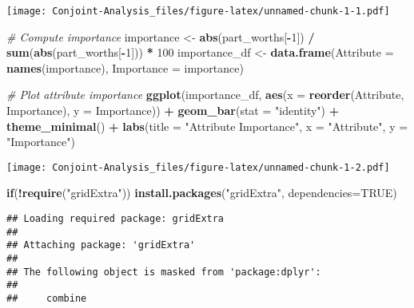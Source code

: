 \documentclass[
]{article}
\newenvironment{Shaded}{\begin{snugshade}}{\end{snugshade}}
\newcommand{\AttributeTok}[1]{\textcolor[rgb]{0.13,0.29,0.53}{#1}}
\newcommand{\CommentTok}[1]{\textcolor[rgb]{0.56,0.35,0.01}{\textit{#1}}}
\newcommand{\ConstantTok}[1]{\textcolor[rgb]{0.56,0.35,0.01}{#1}}
\newcommand{\ControlFlowTok}[1]{\textcolor[rgb]{0.13,0.29,0.53}{\textbf{#1}}}
\newcommand{\DecValTok}[1]{\textcolor[rgb]{0.00,0.00,0.81}{#1}}
\newcommand{\FunctionTok}[1]{\textcolor[rgb]{0.13,0.29,0.53}{\textbf{#1}}}
\newcommand{\NormalTok}[1]{#1}
\newcommand{\OtherTok}[1]{\textcolor[rgb]{0.56,0.35,0.01}{#1}}
\newcommand{\SpecialCharTok}[1]{\textcolor[rgb]{0.81,0.36,0.00}{\textbf{#1}}}
\newcommand{\StringTok}[1]{\textcolor[rgb]{0.31,0.60,0.02}{#1}}
\begin{document}
\texttt{[image: Conjoint-Analysis\_files/figure-latex/unnamed-chunk-1-1.pdf]}

\begin{Shaded}
\begin{Highlighting}[]
\CommentTok{\# Compute importance}
\NormalTok{importance }\OtherTok{\textless{}{-}} \FunctionTok{abs}\NormalTok{(part\_worths[}\SpecialCharTok{{-}}\DecValTok{1}\NormalTok{]) }\SpecialCharTok{/} \FunctionTok{sum}\NormalTok{(}\FunctionTok{abs}\NormalTok{(part\_worths[}\SpecialCharTok{{-}}\DecValTok{1}\NormalTok{])) }\SpecialCharTok{*} \DecValTok{100}
\NormalTok{importance\_df }\OtherTok{\textless{}{-}} \FunctionTok{data.frame}\NormalTok{(}\AttributeTok{Attribute =} \FunctionTok{names}\NormalTok{(importance), }\AttributeTok{Importance =}\NormalTok{ importance)}

\CommentTok{\# Plot attribute importance}
\FunctionTok{ggplot}\NormalTok{(importance\_df, }\FunctionTok{aes}\NormalTok{(}\AttributeTok{x =} \FunctionTok{reorder}\NormalTok{(Attribute, Importance), }\AttributeTok{y =}\NormalTok{ Importance)) }\SpecialCharTok{+}
  \FunctionTok{geom\_bar}\NormalTok{(}\AttributeTok{stat =} \StringTok{"identity"}\NormalTok{) }\SpecialCharTok{+}
  \FunctionTok{theme\_minimal}\NormalTok{() }\SpecialCharTok{+}
  \FunctionTok{labs}\NormalTok{(}\AttributeTok{title =} \StringTok{"Attribute Importance"}\NormalTok{, }\AttributeTok{x =} \StringTok{"Attribute"}\NormalTok{, }\AttributeTok{y =} \StringTok{"Importance"}\NormalTok{)}
\end{Highlighting}
\end{Shaded}

\texttt{[image: Conjoint-Analysis\_files/figure-latex/unnamed-chunk-1-2.pdf]}

\begin{Shaded}
\begin{Highlighting}[]
\ControlFlowTok{if}\NormalTok{(}\SpecialCharTok{!}\FunctionTok{require}\NormalTok{(}\StringTok{"gridExtra"}\NormalTok{)) }\FunctionTok{install.packages}\NormalTok{(}\StringTok{"gridExtra"}\NormalTok{, }\AttributeTok{dependencies=}\ConstantTok{TRUE}\NormalTok{)}
\end{Highlighting}
\end{Shaded}

\begin{verbatim}
## Loading required package: gridExtra
## 
## Attaching package: 'gridExtra'
## 
## The following object is masked from 'package:dplyr':
## 
##     combine
\end{verbatim}
\end{document}
